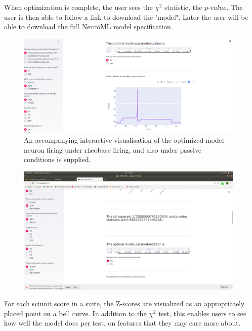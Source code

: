 When optimization is complete, the user sees the $\chi^{2}$ statistic, the $p$-$value$. The user is then able to follow a link to download the "model". Later the user will be able to download the full NeuroML model specification.

\begin{figure}
\begin{center}

\includegraphics[scale=1]{chapters/app_tex/more_app_results}
\end{center}
\caption{An accompanying interactive visualisation of the optimized model neuron firing under rheobase firing, and also under passive conditions is supplied.}

\end{figure}

\begin{figure}
\begin{center}

\includegraphics[scale=1]{chapters/app_tex/Screenshot from 2020-09-19 10-46-32}
\end{center}

\end{figure}


For each sciunit score in a suite, the Z-scores are visualized as an appropriately placed point on a bell curve. In addition to the $\chi^{2}$ test, this enables users to see how well the model does per test, on features that they may care more about.


